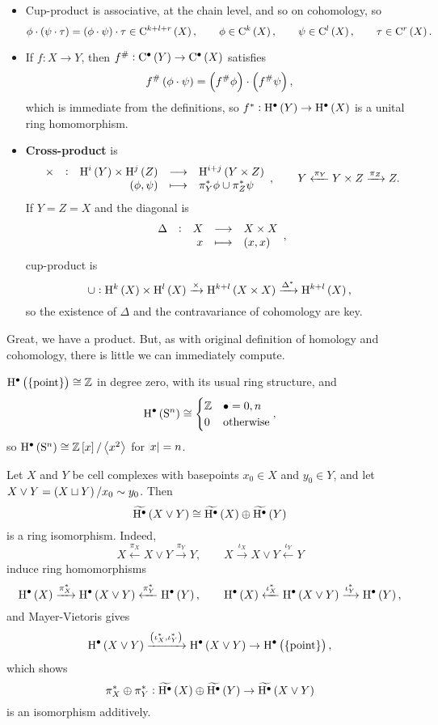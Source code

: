 \begin{proposition}
\hfill
\begin{itemize}
\item Cup-product is associative, at the chain level, and so on cohomology, so
$$ \phi \cdot \br{\psi \cdot \tau} = \br{\phi \cdot \psi} \cdot \tau \in \C^{k + l + r}\br{X}, \qquad \phi \in \C^k\br{X}, \qquad \psi \in \C^l\br{X}, \qquad \tau \in \C^r\br{X}. $$
\item If $ f : X \to Y $, then $ f^\# : \C^\bullet\br{Y} \to \C^\bullet\br{X} $ satisfies
$$ f^\#\br{\phi \cdot \psi} = \br{f^\#\phi} \cdot \br{f^\#\psi}, $$
which is immediate from the definitions, so $ f^* : \H^\bullet\br{Y} \to \H^\bullet\br{X} $ is a unital ring homomorphism.
\item \textbf{Cross-product} is
$$ \function[\times]{\H^i\br{Y} \times \H^j\br{Z}}{\H^{i + j}\br{Y \times Z}}{\br{\phi, \psi}}{\pi_Y^*\phi \cup \pi_Z^*\psi}, \qquad Y \xleftarrow{\pi_Y} Y \times Z \xrightarrow{\pi_Z} Z. $$
If $ Y = Z = X $ and the diagonal is
$$ \function[\Delta]{X}{X \times X}{x}{\br{x, x}}, $$
cup-product is
$$ \cup : \H^k\br{X} \times \H^l\br{X} \xrightarrow{\times} \H^{k + l}\br{X \times X} \xrightarrow{\Delta^*} \H^{k + l}\br{X}, $$
so the existence of $ \Delta $ and the contravariance of cohomology are key.
\end{itemize}
\end{proposition}

Great, we have a product. But, as with original definition of homology and cohomology, there is little we can immediately compute.

\begin{example*}
$ \H^\bullet\br{\pt} \cong \ZZ $ in degree zero, with its usual ring structure, and
$$ \H^\bullet\br{\S^n} \cong
\begin{cases}
\ZZ & \bullet = 0, n \\
0 & \text{otherwise}
\end{cases},
$$
so $ \H^\bullet\br{\S^n} \cong \ZZ\sbr{x} / \abr{x^2} $ for $ \abs{x} = n $.
\end{example*}

\begin{example*}
Let $ X $ and $ Y $ be cell complexes with basepoints $ x_0 \in X $ and $ y_0 \in Y $, and let $ X \vee Y = \br{X \sqcup Y} / x_0 \sim y_0 $. Then
$$ \widetilde{\H^\bullet}\br{X \vee Y} \cong \widetilde{\H^\bullet}\br{X} \oplus \widetilde{\H^\bullet}\br{Y} $$
is a ring isomorphism. Indeed,
$$ X \xleftarrow{\pi_X} X \vee Y \xrightarrow{\pi_Y} Y, \qquad X \xrightarrow{\iota_X} X \vee Y \xleftarrow{\iota_Y} Y $$
induce ring homomorphisms
$$ \H^\bullet\br{X} \xrightarrow{\pi_X^*} \H^\bullet\br{X \vee Y} \xleftarrow{\pi_Y^*} \H^\bullet\br{Y}, \qquad \H^\bullet\br{X} \xleftarrow{\iota_X^*} \H^\bullet\br{X \vee Y} \xrightarrow{\iota_Y^*} \H^\bullet\br{Y}, $$
and Mayer-Vietoris gives
$$ \H^\bullet\br{X \vee Y} \xrightarrow{\br{\iota_X^*, \iota_Y^*}} \H^\bullet\br{X \vee Y} \to \H^\bullet\br{\pt}, $$
which shows
$$ \pi_X^* \oplus \pi_Y^* : \widetilde{\H^\bullet}\br{X} \oplus \widetilde{\H^\bullet}\br{Y} \to \widetilde{\H^\bullet}\br{X \vee Y} $$
is an isomorphism additively.
\end{example*}

